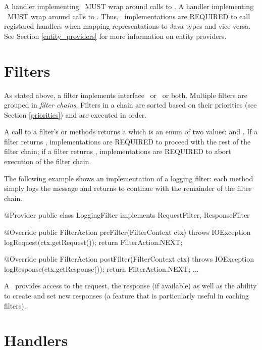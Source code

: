 A handler implementing \ReadFromHandler\ MUST wrap around calls to . A handler implementing \WriteToHandler\ MUST wrap around calls to . Thus, \jaxrs\ implementations are REQUIRED to call registered handlers when mapping representations to Java types and vice versa. See Section \ref{entity_providers} for more information on entity providers.

\section{Filters}
\label{filters}

As stated above, a filter implements interface \RequestFilter\ or \ResponseFilter\ or both. Multiple filters are grouped in \emph{filter chains}. Filters in a chain are sorted based on their priorities (see Section \ref{priorities}) and are executed in order. 

A call to a filter's  or  methods returns a  which is an enum of two values:  and . If a filter returns , implementations are REQUIRED to proceed with the rest of the filter chain; if a filter returns , implementations are REQUIRED to abort execution of the filter chain. 

The following example shows an implementation of a logging filter: each method simply logs the message and returns  to continue with the remainder of the filter chain.

\begin{listing}{1}
@Provider
public class LoggingFilter implements RequestFilter, ResponseFilter {

    @Override
    public FilterAction preFilter(FilterContext ctx) throws IOException {
        logRequest(ctx.getRequest());
        return FilterAction.NEXT;
    }

    @Override
    public FilterAction postFilter(FilterContext ctx) throws IOException {
        logResponse(ctx.getResponse());
        return FilterAction.NEXT;
    }
    ...
}
\end{listing}

A \FilterContext\ provides access to the request, the response (if available) as well as the ability to create and set new responses (a feature that is particularly useful in caching filters).

\section{Handlers}

